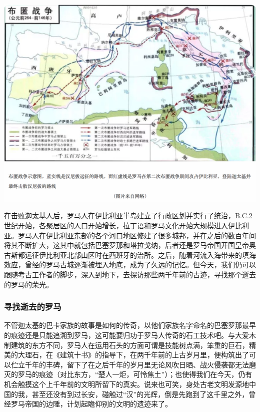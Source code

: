 \documentclass[]{book}
\begin{document}
\includegraphics[width=8.33in]{images/xt12}

在击败迦太基人后，罗马人在伊比利亚半岛建立了行政区划并实行了统治，B.C.2世纪开始，各聚居区的人口开始增长，拉丁语和罗马文化开始大规模进入伊比利亚。罗马人在伊比利亚东部的各个河口地区修建了很多城邦，并在之后的数百年间将其不断扩大，这其中就包括巴塞罗那和塔拉戈纳，后者还是罗马帝国开国皇帝奥古斯都远征伊比利亚北部山区时在西班牙的治所。之后，随着河流入海带来的填海效应，曾经的罗马古城逐渐被埋入地底，成为了久远的记忆。但今天，我们仍可以跟随考古工作者的脚步，深入到地下，去探访那些两千年前的古迹，寻找那个逝去的罗马的荣光。

\hypertarget{ux5bfbux627eux901dux53bbux7684ux7f57ux9a6c}{%
\subsubsection{寻找逝去的罗马}\label{ux5bfbux627eux901dux53bbux7684ux7f57ux9a6c}}

不管迦太基的巴卡家族的故事是如何的传奇，以他们家族名字命名的巴塞罗那最早的痕迹还是只能追溯到罗马，这可能要归功于罗马人传奇的石工技术吧。与大爱木制建筑的东方不同，罗马人在运用石头的方面可谓是技能树点满，笨重的巨石，精美的大理石，在《建筑十书》的指导下，在两千年前的上古岁月里，便构筑出了可以伫立千年的丰碑，留下了在之后千年的岁月里无论风吹日晒、战火侵袭都无法磨灭的罗马的痕迹（对比东方，``楚人一炬，可怜焦土''）；也使得我们在今天，仍有机会触摸这个上千年前的文明所留下的真实。说来也可笑，身处古老文明发源地中国的我，甚至还没有到过长安，碰触过``汉''的光辉，倒是先跑到了这千里之外，曾经罗马帝国的边陲，计划起瞻仰别的文明的遗迹来了。
\end{document}
